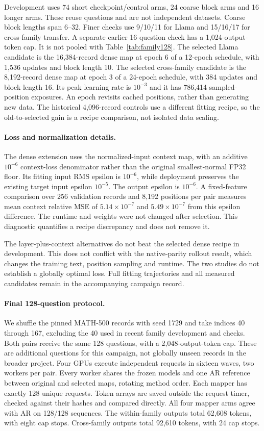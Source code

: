 \documentclass{article}
\begin{document}
Development uses 74 short checkpoint/control arms, 24 coarse block arms
and 16 longer arms. These reuse questions and are not independent datasets.
Coarse block lengths span 6--32. Finer checks use 9/10/11 for Llama and
15/16/17 for cross-family transfer. A separate earlier 16-question check
has a 1,024-output-token cap. It is not pooled with Table~\ref{tab:family128}.
The selected Llama candidate is the 16,384-record dense map at epoch 6
of a 12-epoch schedule, with 1,536 updates and block length 10. The selected
cross-family candidate is the 8,192-record dense map at epoch 3 of a
24-epoch schedule, with 384 updates and block length 16. Its peak learning
rate is $10^{-3}$ and it has 786,414 sampled-position exposures.
An epoch revisits cached positions, rather than generating new data.
The historical 4,096-record controls use a different fitting recipe, so
the old-to-selected gain is a recipe comparison, not isolated data scaling.

\paragraph{Loss and normalization details.}
The dense extension uses the normalized-input context map, with an additive
$10^{-6}$ context-loss denominator rather than the original smallest-normal
FP32 floor. Its fitting input RMS epsilon is $10^{-6}$, while deployment
preserves the existing target input epsilon $10^{-5}$. The output epsilon
is $10^{-6}$. A fixed-feature comparison over 256 validation records and
8,192 positions per pair measures mean context relative MSE of
$5.14\times10^{-7}$ and $5.49\times10^{-7}$ from this epsilon difference.
The runtime and weights were not changed after selection. This diagnostic
quantifies a recipe discrepancy and does not remove it.

The layer-plus-context alternatives do not beat the selected dense recipe
in development. This does not conflict with the native-parity rollout
result, which changes the training text, position sampling and runtime.
The two studies do not establish a globally optimal loss. Full fitting
trajectories and all measured candidates remain in the accompanying
campaign record.

\paragraph{Final 128-question protocol.}
We shuffle the pinned MATH-500 records with seed 1729 and take indices
40 through 167, excluding the 40 used in recent family development and
checks. Both pairs receive the same 128 questions, with a 2,048-output-token
cap. These are additional questions for this campaign, not globally unseen
records in the broader project. Four GPUs execute independent requests
in sixteen waves, two workers per pair. Every worker shares the frozen
models and one AR reference between original and selected maps, rotating
method order. Each mapper has exactly 128 unique requests. Token arrays
are saved outside the request timer, checked against their hashes and
compared directly. All four mapper arms agree with AR on 128/128 sequences.
The within-family outputs total 62,608 tokens, with eight cap stops.
Cross-family outputs total 92,610 tokens, with 24 cap stops.
\end{document}
